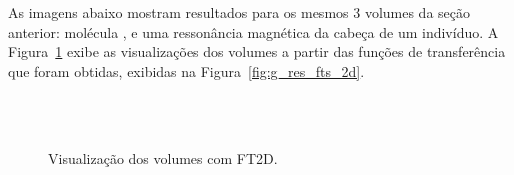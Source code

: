 	As imagens abaixo mostram resultados para os mesmos 3 volumes da seção anterior: molécula ,  e uma ressonância magnética da cabeça de um indivíduo. A Figura~\ref{fig:g_res_vis_2d} exibe as visualizações dos volumes a partir das funções de transferência que foram obtidas, exibidas na Figura~\ref{fig:g_res_fts_2d}.
	
\begin{figure}[h]
	\centering
	\\
	\\
	\caption{Visualização dos volumes com FT2D.}
	\label{fig:g_res_vis_2d}
\end{figure}

